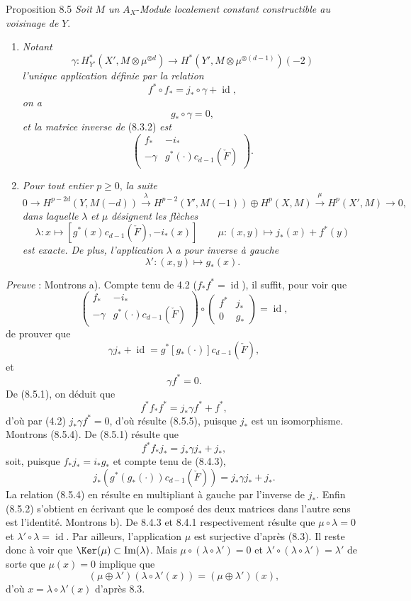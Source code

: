 \begin{statement}{Proposition 8.5}
\emph{Soit} $M$ \emph{un} $A_X$-\emph{Module localement constant constructible au voisinage de} $Y$.
\begin{enumerate}[label=\alph*)]
\item \emph{Notant}
\[
\gamma:H_{Y'}^*(X',M\otimes\mu^{\otimes d})\to
H^*(Y',M\otimes\mu^{\otimes(d-1)})(-2)
\]
\emph{l'unique application définie par la relation}
\[
f^*\circ f_* = j_*\circ\gamma+\operatorname{id},
\tag{8.5.1}
\]
\emph{on a}
\[
g_*\circ\gamma=0,
\tag{8.5.2}
\]
\emph{et la matrice inverse de} (8.3.2) \emph{est}
\[
\begin{pmatrix}
f_*&-i_*\\
-\gamma&g^*(\cdot)c_{d-1}(\check F)
\end{pmatrix}.
\tag{8.5.3}
\]
\item \emph{Pour tout entier} $p\ge0$, \emph{la suite}
\[
0\to H^{p-2d}(Y,M(-d))
\xrightarrow{\lambda}
H^{p-2}(Y',M(-1))\oplus H^p(X,M)
\xrightarrow{\mu}
H^p(X',M)\to0,
\]
\emph{dans laquelle} $\lambda$ \emph{et} $\mu$ \emph{désignent les flèches}
\[
\lambda : x\longmapsto [g^*(x)c_{d-1}(\check F),-i_*(x)]
\qquad
\mu : (x,y)\mapsto j_*(x)+f^*(y)
\]
\emph{est exacte. De plus, l'application} $\lambda$ \emph{a pour inverse à gauche}
\[
\lambda' : (x,y)\longmapsto g_*(x).
\]
\end{enumerate}
\end{statement}

\emph{Preuve} : Montrons a). Compte tenu de 4.2 ($f_*f^*=\operatorname{id}$), il suffit, pour voir que
\[
\begin{pmatrix}
f_*&-i_*\\
-\gamma&g^*(\cdot)c_{d-1}(\check F)
\end{pmatrix}
\circ
\begin{pmatrix}
f^*&j_*\\
0&g_*
\end{pmatrix}
=\operatorname{id},
\]
de prouver que
\[
\gamma j_*+\operatorname{id}=g^*[g_*(\cdot)]c_{d-1}(\check F),
\tag{8.5.4}
\]
et
\[
\gamma f^*=0.
\tag{8.5.5}
\]
De (8.5.1), on déduit que
\[
f^*f_*f^*=j_*\gamma f^*+f^*,
\]
d'où par (4.2) $j_*\gamma f^*=0$, d'où résulte (8.5.5), puisque $j_*$ est un isomorphisme. Montrons (8.5.4). De (8.5.1) résulte que
\[
f^*f_*j_*=j_*\gamma j_*+j_*,
\]
soit, puisque $f_*j_*=i_*g_*$ et compte tenu de (8.4.3),
\[
j_*(g^*(g_*(\cdot))c_{d-1}(\check F))=j_*\gamma j_*+j_*.
\]
La relation (8.5.4) en résulte en multipliant à gauche par l'inverse de $j_*$. Enfin (8.5.2) s'obtient en écrivant que le composé des deux matrices dans l'autre sens est l'identité. Montrons b). De 8.4.3 et 8.4.1 respectivement résulte que $\mu\circ\lambda=0$ et $\lambda'\circ\lambda=\operatorname{id}$. Par ailleurs, l'application $\mu$ est surjective d'après (8.3). Il reste donc à voir que $\Ker(\mu)\subset\operatorname{Im}(\lambda)$. Mais $\mu\circ(\lambda\circ\lambda')=0$ et $\lambda'\circ(\lambda\circ\lambda')=\lambda'$ de sorte que $\mu(x)=0$ implique que
\[
(\mu\oplus\lambda')(\lambda\circ\lambda'(x))=(\mu\oplus\lambda')(x),
\]
d'où $x=\lambda\circ\lambda'(x)$ d'après 8.3.

